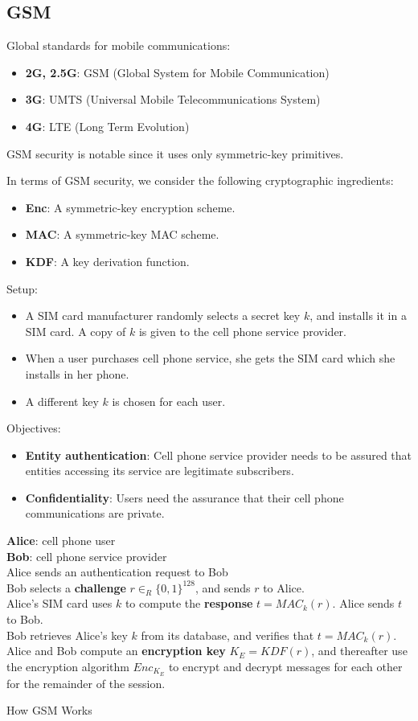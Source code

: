 \documentclass[12pt,titlepage]{article}
\begin{document}
\subsection{GSM}
Global standards for mobile communications:\begin{itemize}
\item \textbf{2G, 2.5G}: GSM (Global System for Mobile Communication)
\item \textbf{3G}: UMTS (Universal Mobile Telecommunications System)
\item \textbf{4G}: LTE (Long Term Evolution)
\end{itemize}
GSM security is notable since it uses only symmetric-key primitives.

In terms of GSM security, we consider the following cryptographic ingredients:\begin{itemize}
\item \textbf{Enc}: A symmetric-key encryption scheme.
\item \textbf{MAC}: A symmetric-key MAC scheme.
\item \textbf{KDF}: A key derivation function.
\end{itemize}
Setup: \begin{itemize}
\item A SIM card manufacturer randomly selects a secret key $k$, and installs it in a SIM card. A copy of $k$ is given to the cell phone service provider.
\item When a user purchases cell phone service, she gets the SIM card which she installs in her phone.
\item A different key $k$ is chosen for each user.
\end{itemize}

Objectives:\begin{itemize}
\item \textbf{Entity authentication}: Cell phone service provider needs to be assured that entities accessing its service are legitimate subscribers.
\item \textbf{Confidentiality}: Users need the assurance that their cell phone communications are private.
\end{itemize}

\begin{algorithm}
	\textbf{Alice}: cell phone user\\
	\textbf{Bob}: cell phone service provider\\
	Alice sends an authentication request to Bob\\
	Bob selects a \textbf{challenge} $r \in_R \{0,1\}^{128}$, and sends $r$ to Alice.\\
	Alice’s SIM card uses $k$ to compute the \textbf{response} $t = MAC_k (r)$. Alice sends $t$ to Bob.\\
	Bob retrieves Alice’s key $k$ from its database, and verifies that $t = MAC_k (r)$.\\
	Alice and Bob compute an \textbf{encryption key} $K_E = KDF (r)$, and thereafter use the encryption algorithm $Enc_{K_E}$ to encrypt and decrypt messages for each other for the remainder of the session.
	\caption{How GSM Works}
\end{algorithm}
\end{document}
